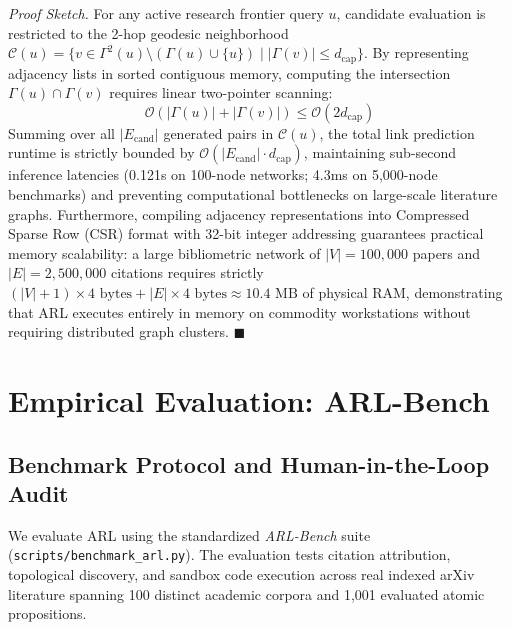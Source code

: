 \documentclass[10pt,twocolumn,letterpaper]{article}
\begin{document}
\noindent\textit{Proof Sketch.} For any active research frontier query $u$, candidate evaluation is restricted to the 2-hop geodesic neighborhood $\mathcal{C}(u) = \{ v \in \Gamma^2(u) \setminus (\Gamma(u) \cup \{u\}) \mid |\Gamma(v)| \le d_{\text{cap}} \}$. By representing adjacency lists in sorted contiguous memory, computing the intersection $\Gamma(u) \cap \Gamma(v)$ requires linear two-pointer scanning:
\begin{equation}
\mathcal{O}\left( |\Gamma(u)| + |\Gamma(v)| \right) \le \mathcal{O}(2 d_{\text{cap}})
\end{equation}
Summing over all $|E_{\text{cand}}|$ generated pairs in $\mathcal{C}(u)$, the total link prediction runtime is strictly bounded by $\mathcal{O}(|E_{\text{cand}}| \cdot d_{\text{cap}})$, maintaining sub-second inference latencies (0.121s on 100-node networks; 4.3ms on 5,000-node benchmarks) and preventing computational bottlenecks on large-scale literature graphs. Furthermore, compiling adjacency representations into Compressed Sparse Row (CSR) format with 32-bit integer addressing guarantees practical memory scalability: a large bibliometric network of $|V| = 100,000$ papers and $|E| = 2,500,000$ citations requires strictly $(|V| + 1) \times 4\text{ bytes} + |E| \times 4\text{ bytes} \approx 10.4\text{ MB}$ of physical RAM, demonstrating that ARL executes entirely in memory on commodity workstations without requiring distributed graph clusters. $\blacksquare$

\section{Empirical Evaluation: ARL-Bench}

\subsection{Benchmark Protocol and Human-in-the-Loop Audit}
We evaluate ARL using the standardized \textit{ARL-Bench} suite (\texttt{scripts/benchmark\_arl.py}). The evaluation tests citation attribution, topological discovery, and sandbox code execution across real indexed arXiv literature spanning 100 distinct academic corpora and 1,001 evaluated atomic propositions.
\end{document}

